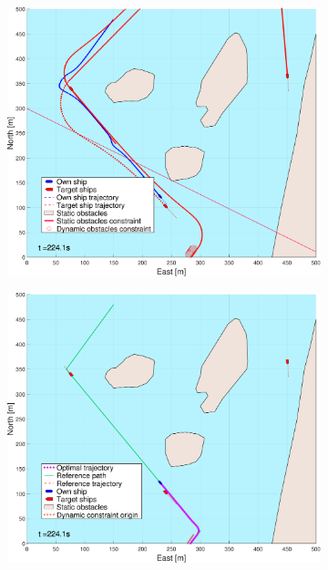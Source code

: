 \begin{figure}[ht]
\begin{subfigure}[b]{0.494\textwidth}
        \subcaption{}
    \end{subfigure}
    \hfill
    \\
    \begin{subfigure}[b]{0.494\textwidth}
        \centering
        \includegraphics[width=\textwidth]{Images/NewFigures/Helloya_Rev/_Simple_0fig1_time=225}
        \subcaption{}
    \end{subfigure}
    \hfill
    \begin{subfigure}[b]{0.494\textwidth}
        \centering
        \includegraphics[width=\textwidth]{Images/NewFigures/Helloya_Rev/_Simple_0fig999_time=225}

\end{subfigure}
\end{figure}

